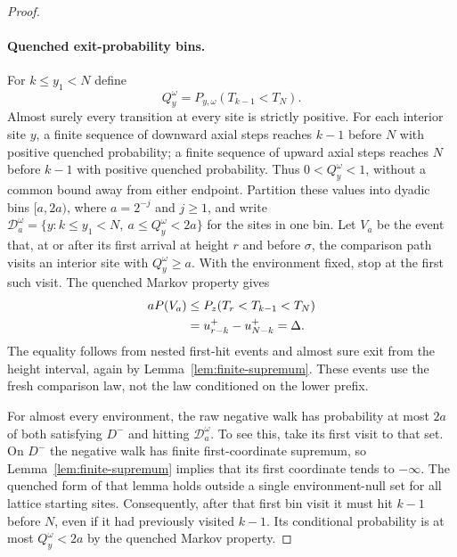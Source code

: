 \begin{proof}
\paragraph{Quenched exit-probability bins.}
For $k\le y_1<N$ define
\[
 Q_y^\omega=P_{y,\omega}(T_{k-1}<T_N).
\]
Almost surely every transition at every site is strictly positive.
For each interior site $y$, a finite sequence of downward axial steps
reaches $k-1$ before $N$ with positive quenched probability; a finite
sequence of upward axial steps reaches $N$ before $k-1$ with positive
quenched probability.  Thus $0<Q_y^\omega<1$, without a common bound
away from either endpoint.  Partition these values into dyadic bins
$[a,2a)$, where $a=2^{-j}$ and $j\ge1$, and write
$\mathcal D_a^\omega=\{y:k\le y_1<N,\ a\le Q_y^\omega<2a\}$
for the sites in one bin.
Let $V_a$ be the event that, at or after its first arrival at height
$r$ and before $\sigma$, the comparison path visits an interior site with
$Q_y^\omega\ge a$.  With the environment fixed, stop at the first such
visit.  The quenched Markov property gives
\begin{align}
 aP(V_a)
 &\le P_z(T_r<T_{k-1}<T_N)\notag\\
 &=u^+_{r-k}-u^+_{N-k}=\Delta.
 \label{eq:comparison-bin-probability}
\end{align}
The equality follows from nested first-hit events and almost sure exit
from the height interval, again by Lemma~\ref{lem:finite-supremum}.
These events use the fresh comparison law, not the law conditioned on
the lower prefix.

For almost every environment, the raw negative walk has probability at
most $2a$ of both satisfying $D^-$ and hitting $\mathcal D_a^\omega$.
To see this, take its first visit to that set.  On $D^-$ the negative walk
has finite first-coordinate supremum, so Lemma~\ref{lem:finite-supremum} implies that its
first coordinate tends to $-\infty$.  The quenched form of that lemma
holds outside a single environment-null set for all lattice starting
sites.  Consequently, after that first bin visit it must hit $k-1$
before $N$, even if it had previously visited $k-1$.  Its conditional
probability is at most $Q_y^\omega<2a$ by the quenched Markov property.


\end{proof}
